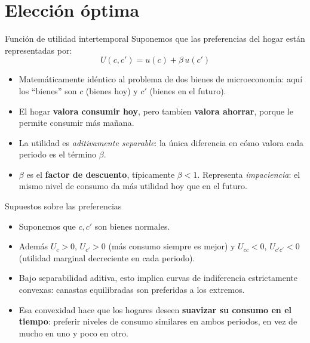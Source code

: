 \documentclass[aspectratio=169,11pt]{beamer}
\newcommand{\notafuentes}[1]{\note{[Sources] #1}}
\begin{document}
\section{Elección óptima}

\begin{frame}{Función de utilidad intertemporal}
  \vspace{0.5em}
  Suponemos que las preferencias del hogar están representadas por:
  $$
  U(c, c') = u(c) + \beta\, u(c')
  $$
  \vspace{-0.6cm}
  \begin{itemize}
    \item Matemáticamente idéntico al problema de dos bienes de microeconomía: aquí los ``bienes'' son \(c\) (bienes hoy) y \(c'\) (bienes en el futuro).
    \item El hogar \textbf{valora consumir hoy}, pero tambien \textbf{valora ahorrar}, porque le permite consumir más mañana.
    \item La utilidad es \textit{aditivamente separable}: la única diferencia en cómo valora cada periodo es el término \(\beta\).
    \item \(\beta\) es el \textbf{factor de descuento}, típicamente \(\beta < 1\). Representa \textit{impaciencia}: el mismo nivel de consumo da más utilidad hoy que en el futuro.
  \end{itemize}

  \notafuentes{Kurlat (2020), sección 6.2.}
\end{frame}


\begin{frame}{Supuestos sobre las preferencias}
  \begin{itemize}
    \setlength{\itemsep}{0.5em}
    \item Suponemos que \(c, c'\) son bienes normales.
    \item Además \(U_c>0\), \(U_{c'}>0\) (más consumo siempre es mejor) y
      \(U_{cc}<0\), \(U_{c'c'}<0\) (utilidad marginal decreciente en cada
      periodo).
    \item Bajo separabilidad aditiva, esto implica curvas de indiferencia
      estrictamente convexas: canastas equilibradas son preferidas a los extremos.
    \item Esa convexidad hace que los hogares deseen \textbf{suavizar su consumo en el tiempo}: preferir niveles de consumo similares en ambos periodos, en vez de mucho en uno y poco en otro.
  \end{itemize}
\end{frame}
\end{document}
